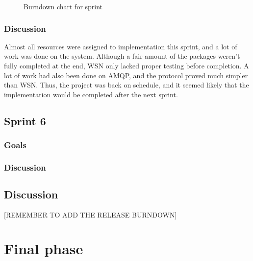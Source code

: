 \begin{center}
  \begin{figure}[ht!]
    \caption{Burndown chart for sprint }
    \label{fig:sprint 5, burndown}
  \end{figure}
\end{center}


\subsubsection{Discussion}
\label{subsec:project_lifecycle-development-sprint_5-discussion}

Almost all resources were assigned to implementation this sprint, and a lot of work was done on the system. Although a fair amount of the packages weren't fully completed at the end, WSN only lacked proper testing before completion. A lot of work had also been done on AMQP, and the protocol proved much simpler than WSN. Thus, the project was back on schedule, and it seemed likely that the implementation would be completed after the next sprint.

\subsection{Sprint 6}
\label{subsec:project_lifecycle-development-sprint_6}

\subsubsection{Goals}
\label{subsec:project_lifecycle-development-sprint_6-goals}

\subsubsection{Discussion}
\label{subsec:project_lifecycle-development-sprint_6-discussion}

\subsection{Discussion}

[REMEMBER TO ADD THE RELEASE BURNDOWN]

\section{Final phase}

\clearpage